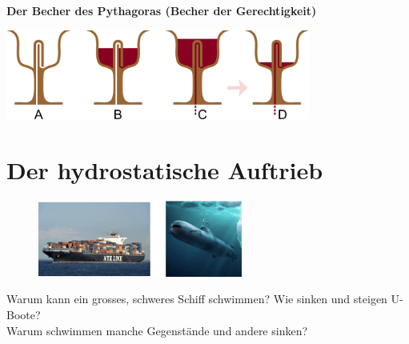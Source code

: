 \documentclass[11pt]{article}
\begin{document}


\vspace{5cm}

\textbf{Der Becher des Pythagoras (Becher der Gerechtigkeit)}
\begin{flushleft}
    \includegraphics[width=0.75\textwidth]{images/Physagorian_Pythagoras.png}
\end{flushleft}






\newpage


\section*{Der hydrostatische Auftrieb}

\begin{figure}[h!]
    \centering
    \includegraphics[width=0.6\textwidth]{images/Auftrieb_Schiff_UBoot.jpg}
\end{figure}

Warum kann ein grosses, schweres Schiff schwimmen? Wie sinken und steigen U-Boote? 
\\Warum schwimmen manche Gegenstände und andere sinken?
\end{document}
